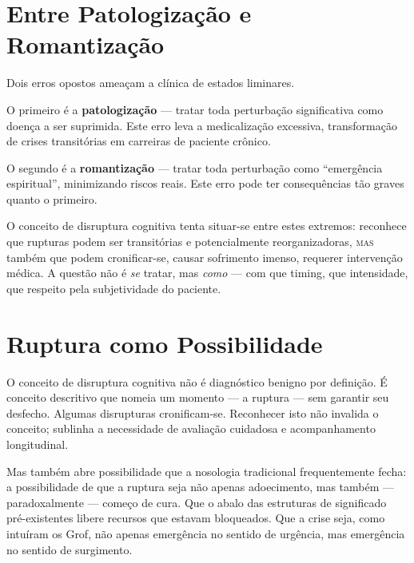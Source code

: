 \section{Entre Patologização e Romantização}
\label{sec:entre-extremos}

Dois erros opostos ameaçam a clínica de estados liminares.

O primeiro é a \textbf{patologização} --- tratar toda perturbação significativa como doença a ser suprimida. Este erro leva a medicalização excessiva, transformação de crises transitórias em carreiras de paciente crônico.

O segundo é a \textbf{romantização} --- tratar toda perturbação como \enquote{emergência espiritual}, minimizando riscos reais. Este erro pode ter consequências tão graves quanto o primeiro.

O conceito de disruptura cognitiva tenta situar-se entre estes extremos: reconhece que rupturas podem ser transitórias e potencialmente reorganizadoras, \textsc{mas} também que podem cronificar-se, causar sofrimento imenso, requerer intervenção médica. A questão não é \textit{se} tratar, mas \textit{como} --- com que timing, que intensidade, que respeito pela subjetividade do paciente.

\section{Ruptura como Possibilidade}
\label{sec:ruptura-possibilidade}

O conceito de disruptura cognitiva não é diagnóstico benigno por definição. É conceito descritivo que nomeia um momento --- a ruptura --- sem garantir seu desfecho. Algumas disrupturas cronificam-se. Reconhecer isto não invalida o conceito; sublinha a necessidade de avaliação cuidadosa e acompanhamento longitudinal.

Mas também abre possibilidade que a nosologia tradicional frequentemente fecha: a possibilidade de que a ruptura seja não apenas adoecimento, mas também --- paradoxalmente --- começo de cura. Que o abalo das estruturas de significado pré-existentes libere recursos que estavam bloqueados. Que a crise seja, como intuíram os Grof, não apenas emergência no sentido de urgência, mas emergência no sentido de surgimento.

